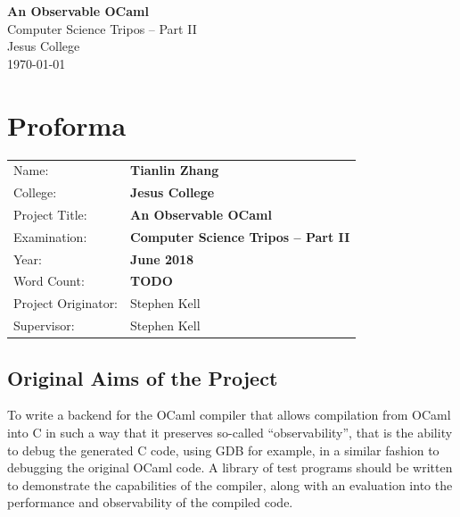 \documentclass[12pt,a4paper,twoside,openright]{report}
\begin{document}





\pagestyle{empty}


\vspace*{60mm}
\begin{center}
\Huge
\textbf{An Observable OCaml} \\[5mm]
Computer Science Tripos -- Part II \\[5mm]
Jesus College \\[5mm]
\today  %
\end{center}


\pagestyle{plain}

\chapter*{Proforma}

{\large
\begin{tabular}{ll}
Name:               & \bf Tianlin Zhang \\
College:            & \bf Jesus College\\
Project Title:      & \bf An Observable OCaml\\
Examination:        & \bf Computer Science Tripos -- Part II\\
Year:               & \bf June 2018\\
Word Count:         & \bf TODO \\
Project Originator: & Stephen Kell \\
Supervisor:         & Stephen Kell \\ 
\end{tabular}
}

\section*{Original Aims of the Project}

To write a backend for the OCaml compiler that allows compilation from OCaml 
into C in such a way that it preserves so-called ``observability'', that is the 
ability to debug the generated C code, using GDB for example, in a similar 
fashion to debugging the original OCaml code. A library of test programs should 
be written to demonstrate the capabilities of the compiler, along with an 
evaluation into the performance and observability of the compiled code.
\end{document}
